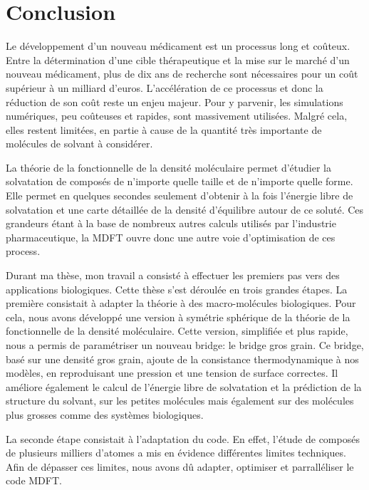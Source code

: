 \chapter{Conclusion}
\label{chap:conclusion}
Le développement d'un nouveau médicament est un processus long et co\^uteux. Entre la détermination d'une cible thérapeutique et la mise sur le marché d'un nouveau médicament, plus de dix ans de recherche sont nécessaires pour un coût supérieur à un milliard d'euros.
L'accélération de ce processus et donc la réduction de son coût reste un enjeu majeur. Pour y parvenir, les simulations numériques, peu co\^uteuses et rapides, sont massivement utilisées. Malgré cela, elles restent limitées, en partie à cause de la quantité très importante de molécules de solvant à considérer.


La théorie de la fonctionnelle de la densité moléculaire permet d'étudier la solvatation de composés de n'importe quelle taille et de n'importe quelle forme. Elle permet en quelques secondes seulement d'obtenir à la fois l'énergie libre de solvatation et une carte détaillée de la densité d'équilibre autour de ce soluté.
Ces grandeurs étant à la base de nombreux autres calculs utilisés par l'industrie pharmaceutique, la MDFT ouvre donc une autre voie d'optimisation de ces process.


Durant ma thèse, mon travail a consisté à effectuer les premiers pas vers des applications biologiques. Cette thèse s'est déroulée en trois grandes étapes. La première consistait à adapter la théorie à des macro-molécules biologiques. Pour cela, nous avons développé une version à symétrie sphérique de la théorie de la fonctionnelle de la densité moléculaire. Cette version, simplifiée et plus rapide, nous a permis de paramétriser un nouveau bridge: le bridge gros grain.
Ce bridge, basé sur une densité gros grain, ajoute de la consistance thermodynamique à nos modèles, en reproduisant une pression et une tension de surface correctes. Il améliore également le calcul de l’énergie libre de solvatation et la prédiction de la structure du solvant, sur les petites molécules mais également sur des molécules plus grosses comme des systèmes biologiques.


La seconde étape consistait à l'adaptation du code. En effet, l'étude de composés de plusieurs milliers d'atomes a mis en évidence différentes limites techniques. Afin de dépasser ces limites, nous avons dû adapter, optimiser et parralléliser le code MDFT.


